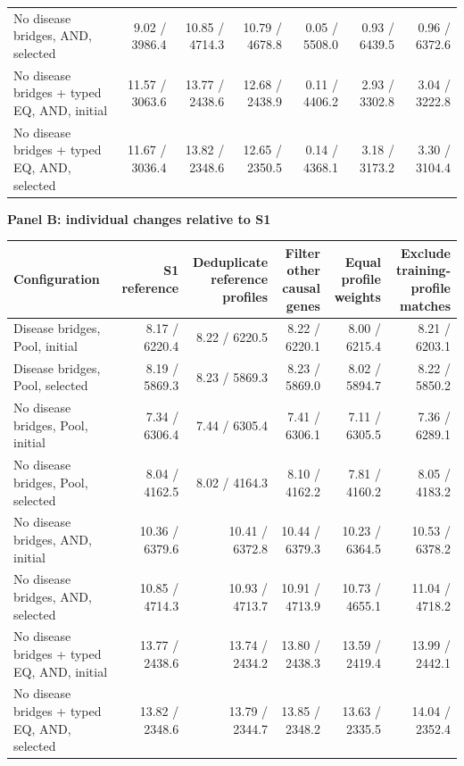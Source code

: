 \begin{landscape}
\begin{table}[p]
\begin{adjustbox}{max width=\linewidth}
\begin{tabular}{lrrrrrr}
No disease bridges, AND, selected & 9.02 / 3986.4 & 10.85 / 4714.3 & 10.79 / 4678.8 & 0.05 / 5508.0 & 0.93 / 6439.5 & 0.96 / 6372.6 \\
No disease bridges + typed EQ, AND, initial & 11.57 / 3063.6 & 13.77 / 2438.6 & 12.68 / 2438.9 & 0.11 / 4406.2 & 2.93 / 3302.8 & 3.04 / 3222.8 \\
No disease bridges + typed EQ, AND, selected & 11.67 / 3036.4 & 13.82 / 2348.6 & 12.65 / 2350.5 & 0.14 / 4368.1 & 3.18 / 3173.2 & 3.30 / 3104.4 \\
\bottomrule
\end{tabular}
\end{adjustbox}
\par\medskip
\textbf{Panel B: individual changes relative to S1}\par\smallskip
\begin{adjustbox}{max width=\linewidth}
\begin{tabular}{lrrrrr}
\toprule
Configuration & S1 reference & \shortstack{Deduplicate\\reference profiles} & \shortstack{Filter other\\causal genes} & \shortstack{Equal profile\\weights} & \shortstack{Exclude training-\\profile matches} \\
\midrule
Disease bridges, Pool, initial & 8.17 / 6220.4 & 8.22 / 6220.5 & 8.22 / 6220.1 & 8.00 / 6215.4 & 8.21 / 6203.1 \\
Disease bridges, Pool, selected & 8.19 / 5869.3 & 8.23 / 5869.3 & 8.23 / 5869.0 & 8.02 / 5894.7 & 8.22 / 5850.2 \\
No disease bridges, Pool, initial & 7.34 / 6306.4 & 7.44 / 6305.4 & 7.41 / 6306.1 & 7.11 / 6305.5 & 7.36 / 6289.1 \\
No disease bridges, Pool, selected & 8.04 / 4162.5 & 8.02 / 4164.3 & 8.10 / 4162.2 & 7.81 / 4160.2 & 8.05 / 4183.2 \\
No disease bridges, AND, initial & 10.36 / 6379.6 & 10.41 / 6372.8 & 10.44 / 6379.3 & 10.23 / 6364.5 & 10.53 / 6378.2 \\
No disease bridges, AND, selected & 10.85 / 4714.3 & 10.93 / 4713.7 & 10.91 / 4713.9 & 10.73 / 4655.1 & 11.04 / 4718.2 \\
No disease bridges + typed EQ, AND, initial & 13.77 / 2438.6 & 13.74 / 2434.2 & 13.80 / 2438.3 & 13.59 / 2419.4 & 13.99 / 2442.1 \\
No disease bridges + typed EQ, AND, selected & 13.82 / 2348.6 & 13.79 / 2344.7 & 13.85 / 2348.2 & 13.63 / 2335.5 & 14.04 / 2352.4 \\
\bottomrule
\end{tabular}
\end{adjustbox}
\end{table}
\clearpage
\end{landscape}
